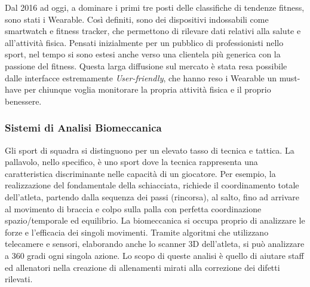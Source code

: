 Dal 2016 ad oggi, a dominare i primi tre posti delle classifiche di tendenze fitness, sono stati i Wearable. Così definiti, sono dei dispositivi indossabili come smartwatch e fitness tracker, che permettono di rilevare dati relativi alla salute e all'attività fisica. Pensati inizialmente per un pubblico di professionisti nello sport, nel tempo si sono estesi anche verso una clientela più generica con la passione del fitness. Questa larga diffusione sul mercato è stata resa possibile dalle interfacce estremamente \textit{User-friendly}, che hanno reso i Wearable un must-have per chiunque voglia monitorare la propria attività fisica e il proprio benessere.




\subsubsection{Sistemi di Analisi Biomeccanica}
Gli sport di squadra si distinguono per un elevato tasso di tecnica e tattica. La pallavolo,  nello specifico, è uno sport dove la tecnica rappresenta una caratteristica discriminante nelle capacità di un giocatore. Per esempio, la realizzazione del fondamentale della schiacciata, richiede il coordinamento totale dell'atleta, partendo dalla sequenza dei passi (rincorsa), al salto, fino ad arrivare al movimento di braccia e colpo sulla palla con perfetta coordinazione spazio/temporale ed equilibrio. La biomeccanica si occupa proprio di analizzare le forze e l'efficacia dei singoli movimenti. Tramite algoritmi che utilizzano telecamere e sensori, elaborando anche lo scanner 3D dell'atleta, si può analizzare a 360 gradi ogni singola azione. Lo scopo di queste analisi è quello di aiutare staff ed allenatori nella creazione di allenamenti mirati alla correzione dei difetti rilevati.



